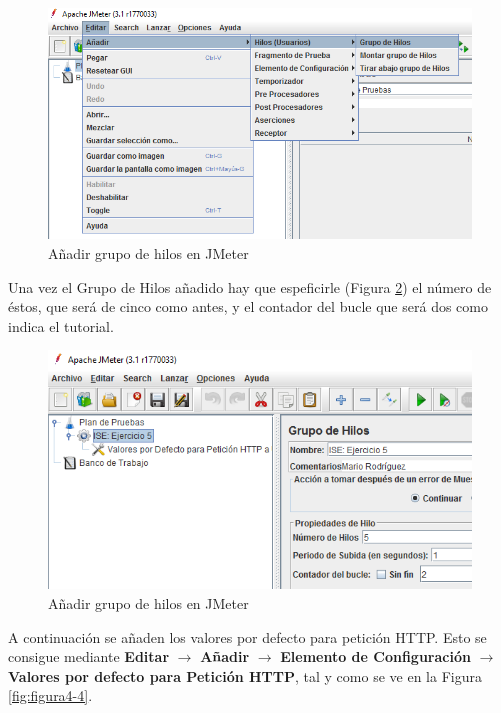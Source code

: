 \begin{figure}[H] %
	\centering
	\includegraphics[scale=0.8]{figuras/ejercicio4/figura4-2.png} 
	\caption{Añadir grupo de hilos en JMeter} 
	\label{fig:figura4-2}
\end{figure}

Una vez el Grupo de Hilos añadido hay que espeficirle (Figura \ref{fig:figura4-3}) el número de éstos, que será de cinco como antes, y el contador del bucle que será dos como indica el tutorial.

\begin{figure}[H] %
	\centering
	\includegraphics[scale=0.8]{figuras/ejercicio4/figura4-3.png} 
	\caption{Añadir grupo de hilos en JMeter} 
	\label{fig:figura4-3}
\end{figure}

A continuación se añaden los valores por defecto para petición HTTP. Esto se consigue mediante \textbf{Editar} $ \rightarrow $ \textbf{Añadir} $ \rightarrow $ \textbf{Elemento de Configuración} $ \rightarrow $ \textbf{Valores por defecto para Petición HTTP}, tal y como se ve en la Figura \ref{fig:figura4-4}.

